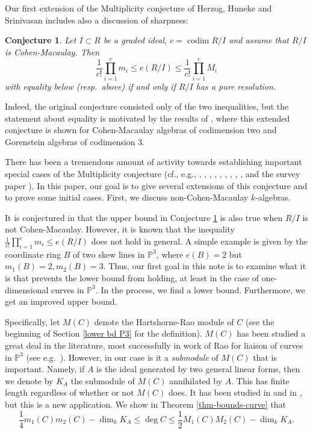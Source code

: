 \documentclass[12pt,twoside]{amsart}
\numberwithin{equation}{section}
\DeclareMathOperator{\codim}{codim}
\newtheorem{conjecture}[theorem]{Conjecture}
\theoremstyle{definition}
\begin{document}
Our first extension of the Multiplicity conjecture of Herzog, Huneke and Srinivasan
includes also a discussion of sharpness:

\begin{conjecture}
\label{conj1} Let $I \subset R$ be a graded ideal,  $c=\codim R/I$ and assume that $R/I$
is Cohen-Macaulay. Then
$$
\frac{1}{c!} \prod_{i=1}^c m_i \leq e(R/I) \leq \frac{1}{c!} \prod_{i=1}^c M_i
$$
with equality below (resp.\ above) if and only if $R/I$ has a pure resolution.
\end{conjecture}

Indeed, the original conjecture consisted only of the two inequalities, but the statement
about equality is motivated by the results of \cite{MNR}, where this extended conjecture
is shown for Cohen-Macaulay algebras of codimension two and Gorenstein algebras of
codimension 3.

There has been a tremendous amount of activity towards establishing important special
cases of the Multiplicity conjecture (cf., e.g., \cite{HM}, \cite{HS}, \cite{srinivasan}
 \cite{gold}, \cite{GSS}, \cite{roemer}, \cite{GV},  \cite{MNR}, \cite{F} \cite{rosapaper},
\cite{H}, and the survey paper \cite{FS}). In this paper, our goal is to give several
extensions of this conjecture and to prove some initial cases.  First, we discuss
non-Cohen-Macaulay  $k$-algebras.

It is conjectured in \cite{HS} that the upper bound in Conjecture \ref{conj1} is also
true when $R/I$ is not Cohen-Macaulay. However, it is known that the inequality
$\frac{1}{c!} \prod_{i=1}^c m_i \leq e(R/I)$ does not hold in general.  A simple example
is given by the coordinate ring $B$ of two skew lines in ${\mathbb P}^3$, where $e(B) =
2$ but $m_1(B) = 2, m_2(B) = 3$. Thus, our first goal in this note is to examine what it
is that prevents the lower bound from holding, at least in the case of one-dimensional
curves in ${\mathbb P}^3$.  In the process, we find a lower bound. Furthermore, we get an
improved upper bound.

Specifically, let $M(C)$ denote the Hartshorne-Rao module of $C$ (see the beginning of
Section \ref{lower bd P3} for the  definition).  $M(C)$ has been studied a great deal in
the literature, most successfully in work of Rao for liaison of curves in ${\mathbb P}^3$
(see e.g.\ \cite{rao}).  However, in our case is it a {\em submodule} of $M(C)$ that is
important.  Namely, if $A$ is the ideal generated by two general linear forms, then we
denote by $K_A$ the submodule of $M(C)$ annihilated by $A$.  This has finite length
regardless of whether or not $M(C)$ does.  It has been studied in \cite{london} and in
\cite{migbook}, but this is a new application.  We show in Theorem \ref{thm-bounds-curve}
that
\[
\frac{1}{4} m_1(C) m_2(C) - \dim_k K_A \leq \deg C \leq \frac{1}{2} M_1(C)M_2(C) - \dim_k
K_A.
\]
\end{document}
